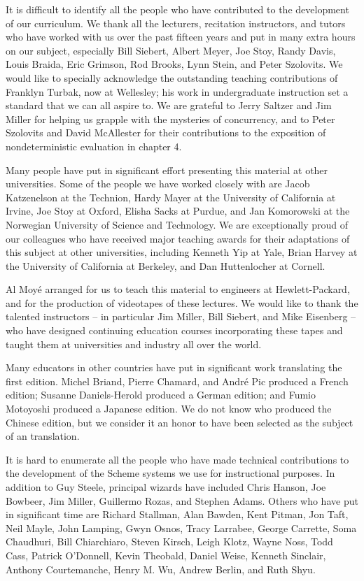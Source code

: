 It is difficult to identify all the people who have contributed to the development of our curriculum.
We thank all the lecturers, recitation instructors,
and tutors who have worked with us over the past fifteen years and put in many extra hours on our subject,
especially
Bill Siebert, Albert Meyer, Joe Stoy, Randy Davis, Louis Braida,
Eric Grimson, Rod Brooks, Lynn Stein, and Peter Szolovits.
We would like to specially acknowledge the outstanding teaching contributions of Franklyn Turbak, now at Wellesley;
his work in undergraduate instruction set a standard that we can all aspire to.
We are grateful to Jerry Saltzer and Jim Miller for helping us grapple with the mysteries of concurrency,
and to Peter Szolovits and David McAllester
for their contributions to the exposition of nondeterministic evaluation in chapter 4.

Many people have put in significant effort presenting this material at other universities.
Some of the people we have worked closely with are
Jacob Katzenelson at the Technion,
Hardy Mayer at the University of California at Irvine,
Joe Stoy at Oxford,
Elisha Sacks at Purdue,
and Jan Komorowski at the Norwegian University of Science and Technology.
We are exceptionally proud of our colleagues
who have received major teaching awards for their adaptations of this subject at other universities,
including
Kenneth Yip at Yale,
Brian Harvey at the University of California at Berkeley,
and Dan Huttenlocher at Cornell.

Al Moyé arranged for us to teach this material to engineers at Hewlett-Packard,
and for the production of videotapes of these lectures.
We would like to thank the talented instructors
-- in particular Jim Miller, Bill Siebert, and Mike Eisenberg --
who have designed continuing education courses incorporating these tapes
and taught them at universities and industry all over the world.

Many educators in other countries have put in significant work translating the first edition.
Michel Briand, Pierre Chamard, and André Pic produced a French edition;
Susanne Daniels-Herold produced a German edition;
and Fumio Motoyoshi produced a Japanese edition.
We do not know who produced the Chinese edition,
but we consider it an honor to have been selected as the subject of an  translation.

It is hard to enumerate all the people
who have made technical contributions to the development of the Scheme systems we use for instructional purposes.
In addition to Guy Steele,
principal wizards have included
Chris Hanson, Joe Bowbeer, Jim Miller, Guillermo Rozas, and Stephen Adams.
Others who have put in significant time are
Richard Stallman, Alan Bawden, Kent Pitman, Jon Taft, Neil Mayle, John Lamping,
Gwyn Osnos, Tracy Larrabee, George Carrette, Soma Chaudhuri, Bill Chiarchiaro,
Steven Kirsch, Leigh Klotz, Wayne Noss, Todd Cass, Patrick O'Donnell,
Kevin Theobald, Daniel Weise, Kenneth Sinclair, Anthony Courtemanche,
Henry M. Wu, Andrew Berlin, and Ruth Shyu.

